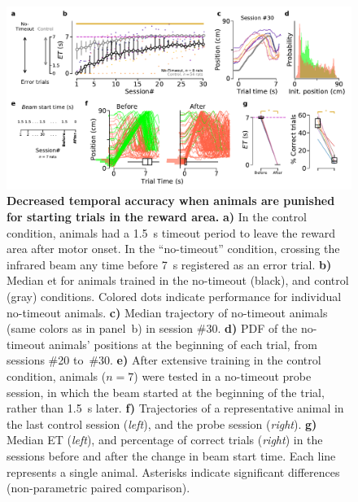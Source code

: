  \begin{figure}[bt!]
  \begin{center}
    \includegraphics[width=\textwidth]{ch-time/figures/NToTrd.pdf}
    \caption[No-Timeout Condition]
    {\textbf{Decreased temporal accuracy when animals are punished for starting trials in the reward area.}
    \textbf{a)}
    In the control condition, animals had a 1.5~s timeout period to leave the reward area after motor onset.
    In the ``no-timeout'' condition, crossing the infrared beam any time before 7~s registered as an error trial.
    \textbf{b)}
    Median \gls{et} for animals trained in the no-timeout (black), and control (gray) conditions.
    Colored dots indicate performance for individual no-timeout animals.
    \textbf{c)}
    Median trajectory of no-timeout animals (same colors as in panel~b) in session \#30.
    \textbf{d)}
    PDF of the no-timeout animals' positions at the beginning of each trial, from sessions \#20 to~\#30.
    \textbf{e)}
    After extensive training in the control condition, animals ($n=7$) were tested in a no-timeout probe session, in which the beam started at the beginning of the trial, rather than 1.5~s later.
    \textbf{f)}
    Trajectories of a representative animal in the last control session (\textit{left}), and the probe session (\textit{right}).
    \textbf{g)}
    Median ET (\textit{left}), and percentage of correct trials (\textit{right}) in the sessions before and after the change in beam start time.
    Each line represents a single animal.
    Asterisks indicate significant differences (non-parametric paired comparison).
    }
    \label{fig:time:ntoTrd}
  \end{center}
\end{figure}